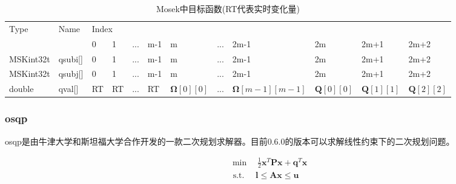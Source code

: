 \begin{table}[htbp]
  \caption{Mosek中目标函数(RT代表实时变化量)}
  \centering
  \begin{tabular}{@{}llllllllllll@{}}
  \toprule
  \multirow{2}{*}{Type} & \multirow{2}{*}{Name} & \multicolumn{10}{l}{Index}     \\ \cmidrule(l){3-12} 
                &  & 0  & 1  & ... & m-1 & m     & ... & 2m-1 & 2m & 2m+1 & 2m+2 \\ \cmidrule(r){1-2}
  MSKint32t   & qsubi{[}{]}    & 0  & 1  & ... & m-1 & m     & ... & 2m-1 & 2m & 2m+1 & 2m+2 \\
  MSKint32t   & qsubj{[}{]}    & 0  & 1  & ... & m-1 & m     & ... & 2m-1 & 2m & 2m+1 & 2m+2 \\
  double      & qval{[}{]}     & RT & RT & ... & RT  & $\bm{\Omega}[0][0]$ & ... &  $\bm{\Omega}[m-1][m-1]$    &  $\bm{Q}[0][0]$  &  $\bm{Q}[1][1]$  & $\bm{Q}[2][2]$  \\ 
  \bottomrule
  \end{tabular}
  \label{tab:mosekobjective}
\end{table}


\subsubsection{osqp}
osqp是由牛津大学和斯坦福大学合作开发的一款二次规划求解器。目前0.6.0的版本可以求解线性约束下的二次规划问题。

\begin{equation}
  \begin{aligned}
  & \min \quad \frac{1}{2} \bm{x}^{T} \bm{P} \bm{x}+\bm{q}^{T} \bm{x} \\
  &\text { s.t. } \quad \bm{l} \leq \bm{A} \bm{x} \leq \bm{u} 
  \end{aligned}
\end{equation}


